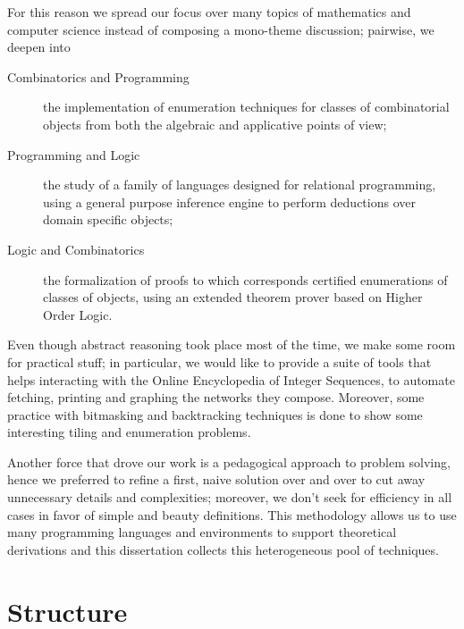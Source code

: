 \documentclass[a4paper, 10pt]{article}
\begin{document}
For this reason we spread our focus over many topics of mathematics and
computer science instead of composing a mono-theme discussion; pairwise,
we deepen into
\begin{description}

    \item[Combinatorics and Programming] the implementation of enumeration
    techniques for classes of combinatorial objects from both the algebraic
    and applicative points of view;

    \item[Programming and Logic] the study of a family of languages designed
    for relational programming, using a general purpose inference engine to
    perform deductions over domain specific objects;

    \item[Logic and Combinatorics] the formalization of proofs to which
    corresponds certified enumerations of classes of objects, using an extended
    theorem prover based on Higher Order Logic.

\end{description}

Even though abstract reasoning took place most of the time, we make
some room for practical stuff; in particular, we would like to provide a suite
of tools that helps interacting with the Online Encyclopedia of Integer
Sequences, to automate fetching, printing and graphing the networks they
compose. Moreover, some practice with bitmasking and backtracking techniques is
done to show some interesting tiling and enumeration problems.

Another force that drove our work is a pedagogical approach to problem solving,
hence we preferred to refine a first, naive solution over and over to cut away
unnecessary details and complexities; moreover, we don't seek for efficiency in
all cases in favor of simple and beauty definitions. This methodology allows us
to use many programming languages and environments to support theoretical
derivations and this dissertation collects this heterogeneous pool of techniques.


\section*{Structure}
\end{document}

